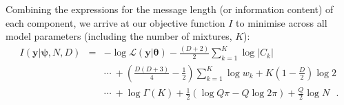 \documentclass{elsarticle}
\newcommand{\vect}[1]{\boldsymbol{\mathbf{#1}}}
\renewcommand{\vec}[1]{\vect{#1}}
\def\cov{C}
\def\vectheta{\vect{\theta}}
\def\weight{w}
\def\datum{y}
\def\data{\vect{\datum}}
\begin{document}
Combining the expressions for the message length (or information content) of
each component, we arrive at our objective function $I$ to minimise across 
all model parameters (including the number of mixtures, $K$):
\begin{eqnarray}
	I(\vec{\data}|\vec{\psi}, N, D) &=& -\log\mathcal{L}\left(\vec{\data}|\vectheta\right) - \frac{(D + 2)}{2}\sum_{k=1}^{K}\log{|{\cov}_k|} \nonumber \\
	&& \cdots\ + \left(\frac{D(D+3)}{4} - \frac{1}{2}\right)\sum_{k=1}^{K}\log{\weight_k} + K\left(1-\frac{D}{2}\right)\log{2} \nonumber \\ && \cdots\ + \log\Gamma{(K)} + \frac{1}{2}\left(\log{Q\pi} - Q\log{2\pi}\right) + \frac{Q}{2}\log{N} \,\,\,\, . 
	\label{eq:objective_function}
\end{eqnarray}
\end{document}
